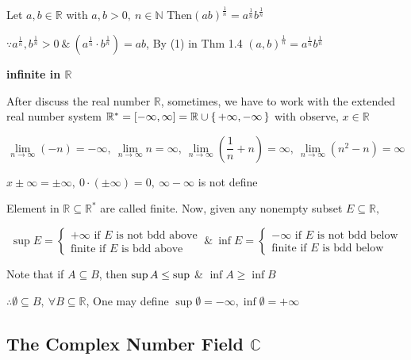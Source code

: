\begin{cor*}
	Let $a,b \in \mathbb{R}$ with $a,b > 0,~ n \in \mathbb{N}$ Then$(ab)^{\frac{1}{n}} = a^{\frac{1}{n}} b^{\frac{1}{n}}$
	
	$\because a^{\frac{1}{n}},b^{\frac{1}{n}} > 0 ~\& ~ (a^{\frac{1}{n}} \cdot b^{\frac{1}{n}}) = ab$, By (1) in Thm 1.4 $(a,b)^{\frac{1}{n}} = a^{\frac{1}{n}}b^{\frac{1}{n}}$
\end{cor*}

\textbf{infinite in $\mathbb R$}



After discuss the real number $\mathbb{R}$, sometimes, we have to work with the extended real number system $\mathbb{R}^* = [-\infty,\infty] = \mathbb{R} \cup \sett{+\infty,-\infty}$ with observe, $x \in \mathbb{R}$

\begin{tcolorbox}
	$$\lim_{n\rightarrow \infty}(-n) = -\infty,~\lim_{n \rightarrow \infty}n=\infty,~\lim_{n \rightarrow \infty}(\frac{1}{n}+n) = \infty,~\lim_{n \rightarrow \infty}(n^2-n) = \infty$$
	
	\begin{center}
		$x \pm \infty = \pm \infty,~ 0\cdot(\pm \infty) = 0,~\infty - \infty$ is not define
	\end{center}
\end{tcolorbox}


Element in $\mathbb R \subseteq \mathbb R^{*}$ are called finite. Now, given any nonempty subset $E \subseteq \mathbb R,$

$$\sup E = \begin{cases}
	+\infty \text{ if } E \text{ is not bdd above}\\\text{finite if $E$ is bdd above}
\end{cases} ~\&~ \inf E =\begin{cases}
	-\infty \text{ if $E$ is not bdd below} \\ \text{finite if $E$ is bdd below}
\end{cases}$$



Note that if $A \subseteq B$, then $\sup A \leq \sub B$ \& $\inf A \geq \inf B$

$\therefore \emptyset \subseteq B,~ \forall B \subseteq \mathbb R$, One may define $\sup \emptyset = - \infty, \inf \emptyset = + \infty$


\subsection{The Complex Number Field $\mathbb C$} $ $

